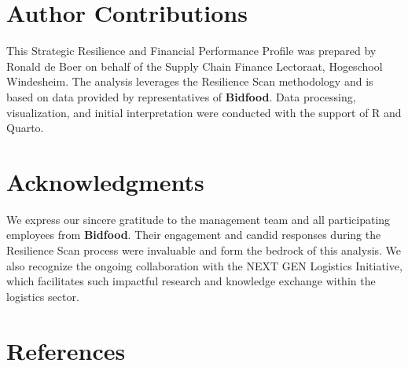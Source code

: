 \documentclass[
  oneside,
  open=any,
  fontsize=11pt]{scrbook}
\begin{document}
\chapter{Author Contributions}\label{author-contributions}

This Strategic Resilience and Financial Performance Profile was prepared
by Ronald de Boer on behalf of the Supply Chain Finance Lectoraat,
Hogeschool Windesheim. The analysis leverages the Resilience Scan
methodology and is based on data provided by representatives of
\textbf{Bidfood}. Data processing, visualization, and initial
interpretation were conducted with the support of R and Quarto.

\chapter{Acknowledgments}\label{acknowledgments}

We express our sincere gratitude to the management team and all
participating employees from \textbf{Bidfood}. Their engagement and
candid responses during the Resilience Scan process were invaluable and
form the bedrock of this analysis. We also recognize the ongoing
collaboration with the NEXT GEN Logistics Initiative, which facilitates
such impactful research and knowledge exchange within the logistics
sector.

\chapter{References}\label{references}

\label{refs}


\backmatter
\end{document}
